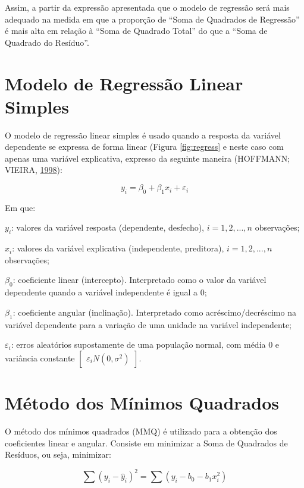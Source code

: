\documentclass[12pt,brazil,oneside]{book}
\begin{document}
Assim, a partir da expressão apresentada que o modelo de regressão será mais adequado na medida em que a proporção de ``Soma de Quadrados de Regressão'' é mais alta em relação à ``Soma de Quadrado Total'' do que a ``Soma de Quadrado do Resíduo''.

\hypertarget{modelo-de-regressao-linear-simples}{%
\section{Modelo de Regressão Linear Simples}\label{modelo-de-regressao-linear-simples}}

O modelo de regressão linear simples é usado quando a resposta da variável dependente se expressa de forma linear (Figura \ref{fig:regress} e neste caso com apenas uma variável explicativa, expresso da seguinte maneira (HOFFMANN; VIEIRA, \protect\hyperlink{ref-hoffmann1998}{1998}):

\[
y_i=\beta_0+\beta_1x_i+\varepsilon _i
\]

Em que:

\(y_i\): valores da variável resposta (dependente, desfecho), \(i = 1,2,...,n\) observações;

\(x_i\): valores da variável explicativa (independente, preditora), \(i = 1,2,...,n\) observações;

\(\beta_0\): coeficiente linear (intercepto). Interpretado como o valor da variável dependente quando a variável independente é igual a 0;

\(\beta_1\): coeficiente angular (inclinação). Interpretado como acréscimo/decréscimo na variável dependente para a variação de uma unidade na variável independente;

\(\varepsilon_i\): erros aleatórios supostamente de uma população normal, com média 0 e variância constante \(\begin{bmatrix}\varepsilon_i N(0, \sigma^2)\end{bmatrix}\).

\hypertarget{metodo-dos-minimos-quadrados}{%
\section{Método dos Mínimos Quadrados}\label{metodo-dos-minimos-quadrados}}

O método dos mínimos quadrados (MMQ) é utilizado para a obtenção dos coeficientes linear e angular. Consiste em minimizar a Soma de Quadrados de Resíduos, ou seja, minimizar:

\[
\sum (y_i-\hat y_i)^2=\sum (y_i-b_0-b_1x_i^2)
\]
\end{document}
